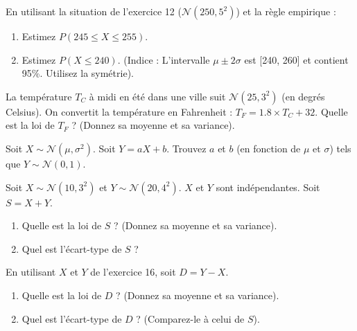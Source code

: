 \begin{exercicebox}
En utilisant la situation de l'exercice 12 ($\mathcal{N}(250, 5^2)$) et la règle empirique :
\begin{enumerate}
    \item Estimez $P(245 \le X \le 255)$.
    \item Estimez $P(X \le 240)$. (Indice : L'intervalle $\mu \pm 2\sigma$ est [240, 260] et contient 95\%. Utilisez la symétrie).
\end{enumerate}
\end{exercicebox}


\begin{exercicebox}
La température $T_C$ à midi en été dans une ville suit $\mathcal{N}(25, 3^2)$ (en degrés Celsius).
On convertit la température en Fahrenheit : $T_F = 1.8 \times T_C + 32$.
Quelle est la loi de $T_F$ ? (Donnez sa moyenne et sa variance).
\end{exercicebox}

\begin{exercicebox}
Soit $X \sim \mathcal{N}(\mu, \sigma^2)$. Soit $Y = aX+b$.
Trouvez $a$ et $b$ (en fonction de $\mu$ et $\sigma$) tels que $Y \sim \mathcal{N}(0, 1)$.
\end{exercicebox}

\begin{exercicebox}
Soit $X \sim \mathcal{N}(10, 3^2)$ et $Y \sim \mathcal{N}(20, 4^2)$. $X$ et $Y$ sont indépendantes.
Soit $S = X + Y$.
\begin{enumerate}
    \item Quelle est la loi de $S$ ? (Donnez sa moyenne et sa variance).
    \item Quel est l'écart-type de $S$ ?
\end{enumerate}
\end{exercicebox}

\begin{exercicebox}
En utilisant $X$ et $Y$ de l'exercice 16, soit $D = Y - X$.
\begin{enumerate}
    \item Quelle est la loi de $D$ ? (Donnez sa moyenne et sa variance).
    \item Quel est l'écart-type de $D$ ? (Comparez-le à celui de $S$).
\end{enumerate}
\end{exercicebox}

